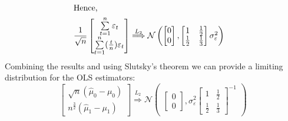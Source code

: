 \documentclass[]{article}
\begin{document}
\begin{enumerate}[label=(\alph*)]
\begin{equation}
\begin{split}
			\intertext{Hence, }
			&\frac{1}{\sqrt{n}}\begin{bmatrix}\sum\limits_{t = 1}^n\varepsilon_t \\ \sum\limits_{t = 1}^n(\frac{t}{n})\varepsilon_t\end{bmatrix} \overset{L_2}{\Longrightarrow}\mathcal{N}\begin{pmatrix}\begin{bmatrix}0 \\ 0\end{bmatrix}, \begin{bmatrix}1 & \frac{1}{2} \\ \frac{1}{2} & \frac{1}{3}\end{bmatrix}\sigma_\varepsilon^2\end{pmatrix}
		\end{split}
	\end{equation}
	Combining the results and using Slutsky's theorem we can provide a limiting distribution for the OLS estimators:
	\begin{equation}
		\begin{bmatrix}\sqrt{n}(\hat{\mu}_0 - \mu_0) \\ n^{\frac{3}{2}}(\hat{\mu}_1 - \mu_1)\end{bmatrix} \overset{L_2}{\Longrightarrow} \mathcal{N}\begin{pmatrix}\begin{bmatrix}0\\0\end{bmatrix}, \sigma_\varepsilon^2\begin{bmatrix}1 & \frac{1}{2} \\ \frac{1}{2} & \frac{1}{3}\end{bmatrix}^{-1}\end{pmatrix} \nonumber
	\end{equation}
	

\end{enumerate}
\end{document}
